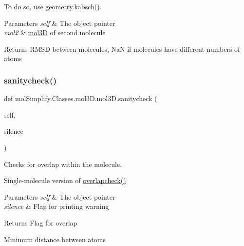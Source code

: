 To do so, use \hyperlink{namespacemolSimplify_1_1Scripts_1_1geometry_ab71755d5aac3ee68201fb79536be659d}{geometry.\+kabsch()}. 
\begin{DoxyParams}{Parameters}
{\em self} & The object pointer \\
\hline
{\em mol2} & \hyperlink{classmolSimplify_1_1Classes_1_1mol3D_1_1mol3D}{mol3D} of second molecule \\
\hline
\end{DoxyParams}
\begin{DoxyReturn}{Returns}
R\+M\+SD between molecules, NaN if molecules have different numbers of atoms 
\end{DoxyReturn}
\mbox{\label{classmolSimplify_1_1Classes_1_1mol3D_1_1mol3D_af79c7b686fca67c122bb1e0507f845a6}} 
\subsubsection{\texorpdfstring{sanitycheck()}{sanitycheck()}}
{\footnotesize\ttfamily def mol\+Simplify.\+Classes.\+mol3\+D.\+mol3\+D.\+sanitycheck (\begin{DoxyParamCaption}\item[{}]{self,  }\item[{}]{silence }\end{DoxyParamCaption})}



Checks for overlap within the molecule. 

Single-\/molecule version of \hyperlink{classmolSimplify_1_1Classes_1_1mol3D_1_1mol3D_aab1e703e70f941dfc764a47dfdd6a121}{overlapcheck()}. 
\begin{DoxyParams}{Parameters}
{\em self} & The object pointer \\
\hline
{\em silence} & Flag for printing warning \\
\hline
\end{DoxyParams}
\begin{DoxyReturn}{Returns}
Flag for overlap 

Minimum distance between atoms 
\end{DoxyReturn}
\mbox{\label{classmolSimplify_1_1Classes_1_1mol3D_1_1mol3D_a27bd691cb90ab44c3acc746dc637baed}} 
